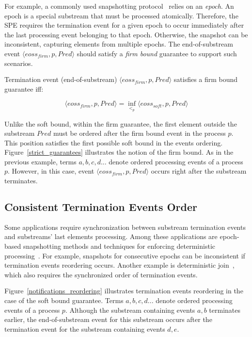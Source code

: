 For example, a commonly used snapshotting protocol~\cite{2015arXiv150608603C, jacques2016consistent} relies on an {\em epoch}. An epoch is a special substream that must be processed atomically. Therefore, the SPE requires the termination event for a given epoch to occur immediately after the last processing event belonging to that epoch. Otherwise, the snapshot can be inconsistent, capturing elements from multiple epochs. The end-of-substream event $\langle eoss_{firm}, p, Pred\rangle$ should satisfy a {\em firm bound } guarantee to support such scenarios.

\begin{definition}
Termination event (end-of-substream) $\langle eoss_{firm}, p, Pred\rangle$ satisfies a firm bound guarantee iff:

\begin{equation}
\langle eoss_{firm}, p, Pred\rangle = \inf_{<_p} \langle eoss_{soft}, p, Pred\rangle
\end{equation}
\end{definition}

Unlike the soft bound, within the firm guarantee, the first element outside the substream $Pred$ must be ordered after the firm bound event in the process $p$. This position satisfies the first possible soft bound in the events ordering. Figure~\ref{strict_guarantees} illustrates the notion of the firm bound. As in the previous example, terms $a,b,c,d...$ denote ordered processing events of a process $p$. However, in this case, event $\langle eoss_{firm}, p, Pred\rangle$ occurs right after the substream terminates.

\subsection{Consistent Termination Events Order}
Some applications require synchronization between substream termination events and substreams' last elements processing. Among these applications are epoch-based snapshotting methods and techniques for enforcing deterministic processing~\cite{we2018adbis}. For example, snapshots for consecutive epochs can be inconsistent if termination events reordering occurs. Another example is deterministic join~\cite{gulisano2016scalejoin}, which also requires the synchronized order of termination events.

Figure~\ref{notifications_reordering} illustrates termination events reordering in the case of the soft bound guarantee. Terms $a,b,c,d...$ denote ordered processing events of a process $p$. Although the substream containing events $a,b$ terminates earlier, the end-of-substream event for this substream occurs after the termination event for the substream containing events $d,e$. 

